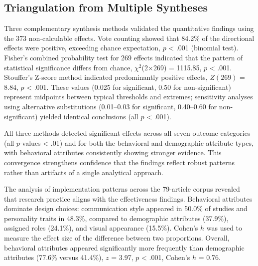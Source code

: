 \documentclass[sigconf,review,anonymous]{acmart}
\begin{document}
\subsection{Triangulation from Multiple Syntheses} \label{sec:triang}

Three complementary synthesis methods validated the quantitative findings using the 373 non-calculable effects. Vote counting showed that 84.2\% of the directional effects were positive, exceeding chance expectation, $p$ < .001 (binomial test). Fisher's combined probability test for 269 effects indicated that the pattern of statistical significance differs from chance, $\chi^2$(2$\times$269) = 1115.85, $p$ < .001. Stouffer's Z-score method indicated predominantly positive effects, $Z(269)$ = 8.84, $p$ < .001. These values (0.025 for significant, 0.50 for non-significant) represent midpoints between typical thresholds and extremes; sensitivity analyses using alternative substitutions (0.01–0.03 for significant, 0.40–0.60 for non-significant) yielded identical conclusions (all $p$ < .001).

All three methods detected significant effects across all seven outcome categories (all $p$-values < .01) and for both the behavioral and demographic attribute types, with behavioral attributes consistently showing stronger evidence. This convergence strengthens confidence that the findings reflect robust patterns rather than artifacts of a single analytical approach.

The analysis of implementation patterns across the 79-article corpus revealed that research practice aligns with the effectiveness findings. Behavioral attributes dominate design choices: communication style appeared in 50.0\% of studies and personality traits in 48.3\%, compared to demographic attributes (37.9\%), assigned roles (24.1\%), and visual appearance (15.5\%). Cohen's $h$ was used to measure the effect size of the difference between two proportions. Overall, behavioral attributes appeared significantly more frequently than demographic attributes (77.6\% versus 41.4\%), $z$ = 3.97, $p$ < .001, Cohen's $h$ = 0.76.

\end{document}
